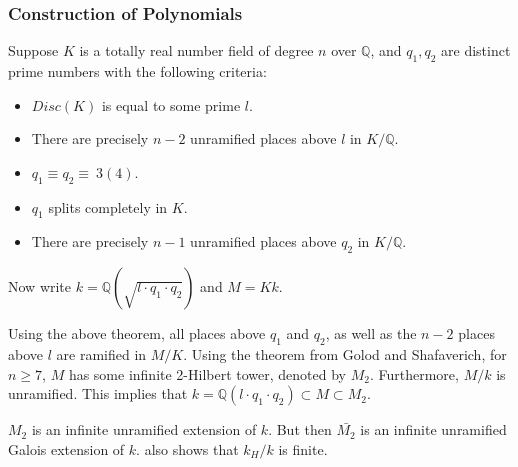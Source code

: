 \documentclass[12pt]{extarticle}
\newcommand{\Q}{\mathbb{Q}}
\newcommand{\<}{\langle}
\renewcommand{\>}{\rangle}
\theoremstyle{definition}
\begin{document}
\subsubsection*{Construction of Polynomials}
Suppose $K$ is a totally real number field of degree $n$ over $\Q$, and $q_1,q_2$ are distinct prime numbers with the following criteria:
\begin{itemize}
\item $Disc(K)$ is equal to some prime $l$.
\item There are precisely $n-2$ unramified places above $l$ in $K/\Q$. 
\item $q_1 \equiv q_2 \equiv \: 3 (4)$.
\item $q_1$ splits completely in $K$.
\item There are precisely $n-1$ unramified places above $q_2$ in $K/\Q$. 
\end{itemize}\par

Now write $k=\Q(\sqrt{l \cdot q_1 \cdot q_2})$ and $M=Kk$. 

Using the above theorem, all places above $q_1$ and $q_2$, as well as the $n-2$ places above $l$ are ramified in $M/K$. Using the theorem from Golod and Shafaverich, for $n \geq 7$, $M$ has some infinite 2-Hilbert tower, denoted by $M_2$. Furthermore, $M/k$ is unramified. This implies that 
$k = \Q(l \cdot q_1 \cdot q_2) \subset M \subset M_2$.\par
$M_2$ is an infinite unramified extension of $k$. But then $\bar{M_2}$ is an infinite unramified Galois extension of $k$.
\cite{MAIR} also shows that $k_H/k$ is finite.  
\end{document}
